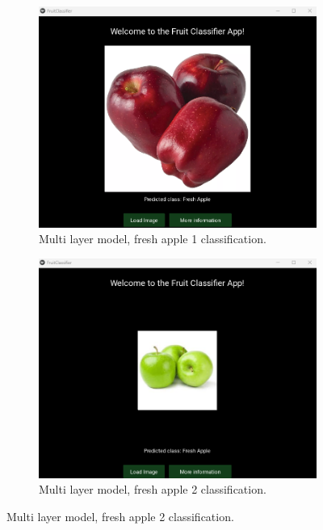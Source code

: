 \documentclass[conference]{IEEEtran}
\begin{document}
\begin{figure}[h]
    \centering
    \begin{subfigure}[b]{0.48\linewidth}
        \centering
        \includegraphics[width=\linewidth]{Mlayer appel1.png}
        \caption{Multi layer model, fresh apple 1 classification.}
        \label{figFA}
    \end{subfigure}
    \hfill
    \begin{subfigure}[b]{0.48\linewidth}
        \centering
        \includegraphics[width=\linewidth]{Mlayer appel2.png}
        \caption{Multi layer model, fresh apple 2 classification.}
        \label{figFB}

\end{subfigure}
\end{figure}
\end{document}
